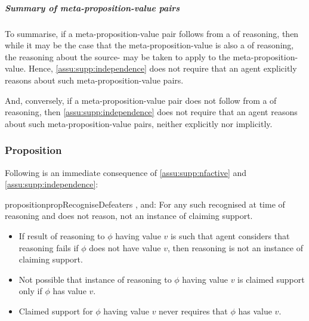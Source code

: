 \subparagraph*{Summary of meta-proposition-value pairs}

\begin{note}
  To summarise, if a meta-proposition-value pair follows from a  of reasoning, then while it may be the case that the meta-proposition-value is also a  of reasoning, the reasoning about the source- may be taken to apply to the meta-proposition-value.
  Hence, \autoref{assu:supp:independence} does not require that an agent explicitly reasons about such meta-proposition-value pairs.

  And, conversely, if a meta-proposition-value pair does not follow from a  of reasoning, then \autoref{assu:supp:independence} does not require that an agent reasons about such meta-proposition-value pairs, neither explicitly nor implicitly.
\end{note}


\subsubsection{Proposition}
\label{sec:proposition}

\begin{note}
  Following is an immediate consequence of \ref{assu:supp:nfactive} and \autoref{assu:supp:independence}:

  \begin{restatable}{proposition}{propRecogniseDefeaters}
    \label{prop:CS-only-if-reason-recognised-defeaters}
    \requ{}, and:
    For any such recognised \requ{} at time of reasoning and does not reason, not an instance of claiming support.
  \end{restatable}
\end{note}

  \begin{note}
  \begin{itemize}
  \item If result of reasoning to \(\phi\) having value \(v\) is such that agent considers that reasoning fails if \(\phi\) does not have value \(v\), then reasoning is not an instance of claiming support.
  \item Not possible that instance of reasoning to \(\phi\) having value \(v\) is claimed support only if \(\phi\) has value \(v\).
  \item Claimed support for \(\phi\) having value \(v\) never requires that \(\phi\) has value \(v\).
  \end{itemize}
\end{note}

